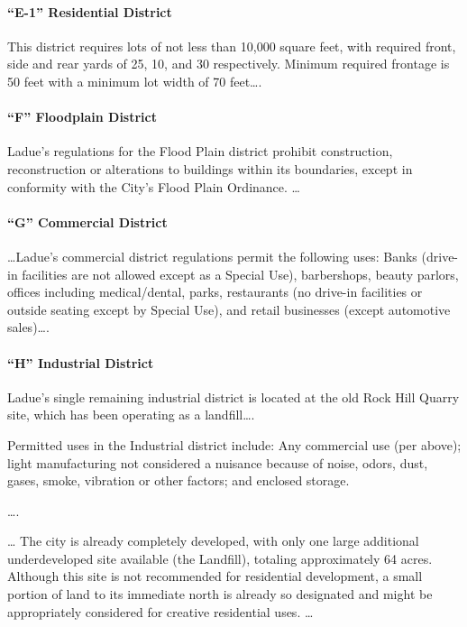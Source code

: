 \paragraph{``E-1'' Residential District} This district requires lots of not less
than 10,000 square feet, with required front, side and rear yards of 25, 10, and
30 respectively. Minimum required frontage is 50 feet with a minimum lot width
of 70 feet\ldots .

\paragraph{``F'' Floodplain District} Ladue's regulations for the Flood Plain
district prohibit construction, reconstruction or alterations to buildings
within its boundaries, except in conformity with the City's Flood Plain
Ordinance. \ldots

\paragraph{``G'' Commercial District}\ldots Ladue's commercial district
regulations permit the following uses: Banks (drive-in facilities are not
allowed except as a Special Use), barbershops, beauty parlors, offices including
medical/dental, parks, restaurants (no drive-in facilities or outside seating
except by Special Use), and retail businesses (except automotive sales)\ldots .

\paragraph{``H'' Industrial District} Ladue's single remaining industrial
district is located at the old Rock Hill Quarry site, which has been operating
as a landfill\ldots .

Permitted uses in the Industrial district include: Any commercial use (per
above); light manufacturing not considered a nuisance because of noise, odors,
dust, gases, smoke, vibration or other factors; and enclosed storage.



\ldots.


\ldots
The city is already completely developed, with only one large additional
underdeveloped site available (the Landfill), totaling approximately 64 acres.
Although this site is not recommended for residential development, a small
portion of land to its immediate north is already so designated and might be
appropriately considered for creative residential uses. \ldots


